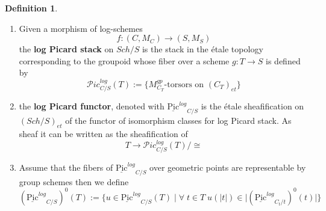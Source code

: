 \documentclass{amsart}
\theoremstyle{definition}
\newtheorem{definition}[thm]{Definition}
\numberwithin{equation}{section}
\begin{document}
\begin{definition}

\begin{enumerate}

\item Given a morphism of log-schemes 
    $$
    f:(C,M_C){\rightarrow} (S,M_S)
    $$
    \noindent the \textbf{log Picard stack} on $Sch/S$ is the stack in the \'etale topology corresponding to the groupoid whose fiber over a scheme $g: T{\rightarrow} S$ is defined by
$$
\mathcal{P}ic_{C/S}^{log}(T):=\{M_{C_T}^{gp} \mbox{-torsors on } (C_{T})_{et}\}
$$
\item the \textbf{log Picard functor}, denoted with ${\underline{\mbox{Pic}}^{log}}_{C/S}$ is the \'etale sheafification on $(Sch/S)_{{et}}$ of the functor of isomorphism classes for log Picard stack. As sheaf it can be written as the sheafification of
$$
T{\rightarrow} \mathcal{P}ic_{C/S}^{log}(T)/\cong
$$
\item Assume that the fibers of ${\underline{\mbox{Pic}}^{log}}_{C/S}$ over geometric points are representable by group schemes then we define  
$$
({\underline{\mbox{Pic}}^{log}}_{C/S})^{0}(T):= \{u\in {\underline{\mbox{Pic}}^{log}}_{C/S}(T) \; |\;  \forall \; t\in T \; u(|t|)\in |({\underline{\mbox{Pic}}^{log}}_{C_t/t})^0(t)|\}
$$
\end{enumerate}
\end{definition}
\end{document}
